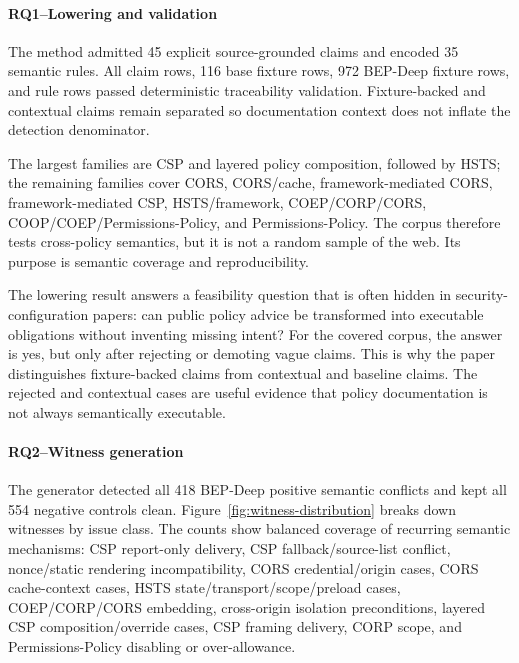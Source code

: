 \documentclass[10pt,conference]{IEEEtran}
\begin{document}


\paragraph{RQ1--Lowering and validation}

The method admitted 45 explicit source-grounded claims and encoded 35 semantic rules. All claim rows, 116 base fixture rows, 972 BEP-Deep fixture rows, and rule rows passed deterministic traceability validation. Fixture-backed and contextual claims remain separated so documentation context does not inflate the detection denominator.


The largest families are CSP and layered policy composition, followed by HSTS; the remaining families cover CORS, CORS/cache, framework-mediated CORS, framework-mediated CSP, HSTS/framework, COEP/CORP/CORS, COOP/COEP/Permissions-Policy, and Permissions-Policy. The corpus therefore tests cross-policy semantics, but it is not a random sample of the web. Its purpose is semantic coverage and reproducibility.

The lowering result answers a feasibility question that is often hidden in security-configuration papers: can public policy advice be transformed into executable obligations without inventing missing intent? For the covered corpus, the answer is yes, but only after rejecting or demoting vague claims. This is why the paper distinguishes fixture-backed claims from contextual and baseline claims. The rejected and contextual cases are useful evidence that policy documentation is not always semantically executable.

\paragraph{RQ2--Witness generation}

The generator detected all 418 BEP-Deep positive semantic conflicts and kept all 554 negative controls clean. Figure~\ref{fig:witness-distribution} breaks down witnesses by issue class. The counts show balanced coverage of recurring semantic mechanisms: CSP report-only delivery, CSP fallback/source-list conflict, nonce/static rendering incompatibility, CORS credential/origin cases, CORS cache-context cases, HSTS state/transport/scope/preload cases, COEP/CORP/CORS embedding, cross-origin isolation preconditions, layered CSP composition/override cases, CSP framing delivery, CORP scope, and Permissions-Policy disabling or over-allowance.
\end{document}
